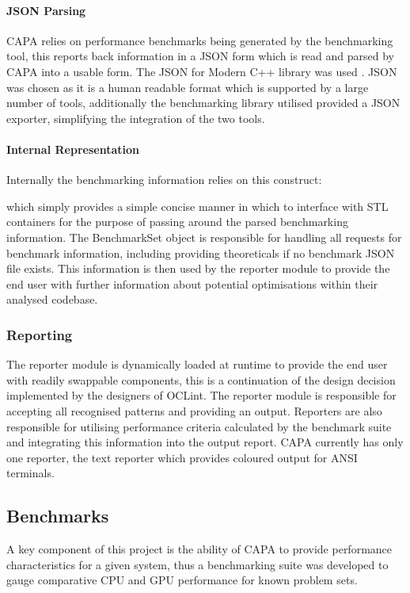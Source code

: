 \paragraph{JSON Parsing}
CAPA relies on performance benchmarks being generated by the benchmarking tool, this reports back
information in a JSON form which is read and parsed by CAPA into a usable form. The JSON for Modern
C++ library was used \cite{JSON}. JSON was chosen as it is a human readable format which is
supported by a large number of tools, additionally the benchmarking library utilised provided a JSON
exporter, simplifying the integration of the two tools.

\paragraph{Internal Representation}
Internally the benchmarking information relies on this construct:

which simply provides a simple concise manner in which to interface with STL containers for the
purpose of passing around the parsed benchmarking information. The BenchmarkSet object is
responsible for handling all requests for benchmark information, including providing theoreticals if
no benchmark JSON file exists. This information is then used by the reporter module to provide the
end user with further information about potential optimisations within their analysed codebase.

\subsubsection{Reporting}
The reporter module is dynamically loaded at runtime to provide the end user with readily swappable
components, this is a continuation of the design decision implemented by the designers of OCLint.
The reporter module is responsible for accepting all recognised patterns and providing an output.
Reporters are also responsible for utilising performance criteria calculated by the benchmark suite
and integrating this information into the output report. CAPA currently has only one reporter, the
text reporter which provides coloured output for ANSI terminals.

\subsection{Benchmarks}
A key component of this project is the ability of CAPA to provide performance characteristics for a
given system, thus a benchmarking suite was developed to gauge comparative CPU and GPU performance
for known problem sets.

